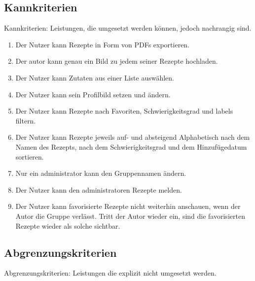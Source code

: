 \documentclass[parskip=full]{scrartcl}
\begin{document}
\subsection{Kannkriterien}
Kannkriterien: Leistungen, die umgesetzt werden können, jedoch nachrangig sind.

\begin{enumerate}[start=1,label={$\langle$\bfseries RC\arabic*$\rangle$}, leftmargin = 5em, itemsep=4pt, parsep=4pt]
    \item Der Nutzer kann Rezepte in Form von PDFs exportieren.\label{rc:PDFExport}
    \item Der \Gls{autor} kann genau ein Bild zu jedem seiner Rezepte hochladen.\label{rc:Images}
    \item Der Nutzer kann Zutaten aus einer Liste auswählen.\label{rc:IngredientList}
    \item Der Nutzer kann sein Profilbild setzen und ändern.\label{rc:ProfileImage}
    \item Der Nutzer kann Rezepte nach Favoriten, Schwierigkeitsgrad und \Gls{labels} filtern.\label{rc:Filtering}
    \item Der Nutzer kann Rezepte jeweils auf- und absteigend Alphabetisch nach dem Namen des Rezepts, nach dem Schwierigkeitsgrad und dem Hinzufügedatum sortieren.\label{rc:Sorting}
    \item Nur ein \Gls{administrator} kann den Gruppennamen ändern.\label{rc:GroupRenaming}
    \item Der Nutzer kann den \Gls{administrator}en Rezepte melden.\label{rc:RecipeMelden}
    \item Der Nutzer kann favorisierte Rezepte nicht weiterhin anschauen, wenn der Autor die Gruppe verlässt. Tritt der Autor wieder ein, sind die favorisierten Rezepte wieder als solche sichtbar.\label{rc:FavoriteAuthorRejoin}

\end{enumerate}

\subsection{Abgrenzungskriterien}
Abgrenzungskriterien: Leistungen die explizit nicht umgesetzt werden.
\end{document}
